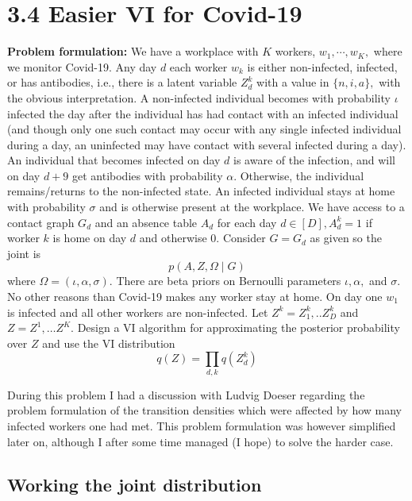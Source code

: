 \section*{3.4 Easier VI for Covid-19}
\begin{tcolorbox}
\textbf{Problem formulation:} We have a workplace with $K$ workers, $w_{1}, \cdots, w_{K},$ where we monitor Covid-19. Any day $d$ each worker $w_{k}$ is either non-infected, infected, or has antibodies, i.e., there is a latent variable $Z_{d}^{k}$ with a value in $\{n, i, a\},$ with the obvious interpretation. A non-infected individual becomes with probability $\iota$ infected the day after the individual has had contact with an infected individual (and though only one such contact may occur with any single infected individual during a day, an uninfected may have contact with several infected during a day). An individual that becomes infected on day $d$ is aware of the infection, and will on day $d+9$ get antibodies with probability $\alpha .$ Otherwise, the individual remains/returns to the non-infected state. An infected individual stays at home with probability $\sigma$ and is otherwise present at the workplace. We have access to a contact graph $G_{d}$ and an absence table $A_{d}$ for each day $d \in[D], A_{d}^{k}=1$ if worker $k$ is home on day $d$ and otherwise $0 .$ Consider $G=G_{d}$ as given so the joint is
$$
p(A, Z, \Omega \mid G)
$$
where $\Omega=(\iota, \alpha, \sigma) .$ There are beta priors on Bernoulli parameters $\iota, \alpha,$ and $\sigma .$ No other reasons than Covid-19 makes any worker stay at home. On day one $w_{1}$ is infected and all other workers are non-infected. Let $Z^{k}=Z_{1}^{k}, . . Z_{D}^{k}$ and $Z=Z^{1}, \ldots Z^{K} .$ Design a VI algorithm for approximating the posterior probability over $Z$ and use the VI distribution
$$
q(Z)=\prod_{d, k} q\left(Z_{d}^{k}\right)
$$
\end{tcolorbox}
During this problem I had a discussion with Ludvig Doeser regarding the problem formulation of the transition densities which were affected by how many infected workers one had met. This problem formulation was however simplified later on, although I after some time managed (I hope) to solve the harder case. 

\subsection*{Working the joint distribution}

